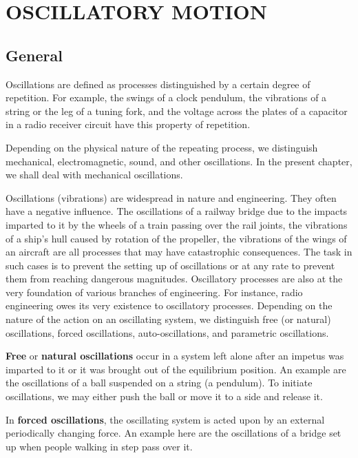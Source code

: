 

\chapter{OSCILLATORY MOTION}\label{chap:7}

\section{General}\label{sec:7_1}

Oscillations are defined as processes distinguished by a certain degree of repetition. For example, the swings of a clock pendulum, the vibrations of a string or the leg of a tuning fork, and the voltage across the plates of a capacitor in a radio receiver circuit have this property of repetition.

Depending on the physical nature of the repeating process, we distinguish mechanical, electromagnetic, sound, and other oscillations. In the present chapter, we shall deal with mechanical oscillations.

Oscillations (vibrations) are widespread in nature and engineering. They often have a negative influence. The oscillations of a railway bridge due to the impacts imparted to it by the wheels of a train passing over the rail joints, the vibrations of a ship's hull caused by rotation of the propeller, the vibrations of the wings of an aircraft are all processes that may have catastrophic consequences. The task in such cases is to prevent the setting up of oscillations or at any rate to prevent them from reaching dangerous magnitudes.
Oscillatory processes are also at the very foundation of various branches of engineering. For instance, radio engineering owes its very existence to oscillatory processes. Depending on the nature of the action on an oscillating system, we distinguish free (or natural) oscillations, forced oscillations, auto-oscillations, and parametric oscillations.

\textbf{Free} or \textbf{natural oscillations} occur in a system left alone after an impetus was imparted to it or it was brought out of the equilibrium position. An example are the oscillations of a ball suspended on a string (a pendulum). To initiate oscillations, we may either push the ball or move it to a side and release it.

In \textbf{forced oscillations}, the oscillating system is acted upon by an external periodically changing force. An example here are the oscillations of a bridge set up when people walking in step pass over it.

